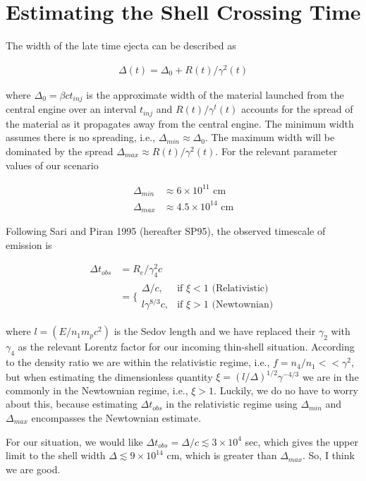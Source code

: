 \documentclass[linenumbers,twocolumn]{aastex631}
\begin{document}
\section{Estimating the Shell Crossing Time}
{
    The width of the late time ejecta can be described as

    \begin{align}
        \Delta(t) = \Delta_0 + R(t)/\gamma^2(t)
    \end{align}

    where $\Delta_0 = \beta c t_{inj}$ is the approximate width of the material launched from the central engine over an interval $t_{inj}$ and $R(t)/\gamma^t(t)$ accounts for the spread of the material as it propagates away from the central engine. The minimum width assumes there is no spreading, i.e., $\Delta_{min} \approx \Delta_0$. The maximum width will be dominated by the spread $\Delta_{max}\approx R(t)/\gamma^2(t)$. For the relevant parameter values of our scenario

    \begin{align}
        \Delta_{min} &\approx 6\times10^{11} \text{ cm}\\
        \Delta_{max} &\approx 4.5\times10^{14} \text{ cm}
    \end{align}

    Following Sari and Piran 1995 (hereafter SP95), the observed timescale of emission is

    \begin{align}
        \Delta t_{obs} &= R_e / \gamma^2_4c \label{eq: t_obs} \\
        &= \bigg\{ \begin{array}{ll}
            \Delta/c, & \text{if } \xi < 1\text{ (Relativistic)}\\
            l\gamma^{8/3}c, & \text{if } \xi > 1 \text{ (Newtownian)}
        \end{array}
    \end{align}

    where $l = (E/n_1 m_p c^2)$ is the Sedov length and we have replaced their $\gamma_2$ with $\gamma_4$ as the relevant Lorentz factor for our incoming thin-shell situation. According to the density ratio we are within the relativistic regime, i.e., $f = n_4/n_1 << \gamma^2$, but when estimating the dimensionless quantity $\xi = (l/\Delta)^{1/2} \gamma^{-4/3}$ we are in the commonly in the Newtownian regime, i.e., $\xi > 1$. Luckily, we do no have to worry about this, because estimating $\Delta t_{obs}$ in the relativistic regime using $\Delta_{min}$ and $\Delta_{max}$ encompasses the Newtownian estimate.

    For our situation, we would like $\Delta t_{obs} = \Delta/c \lesssim 3\times10^4$ sec, which gives the upper limit to the shell width $\Delta \lesssim 9\times10^{14}$ cm, which is greater than $\Delta_{max}$. So, I think we are good. 
}
\end{document}
